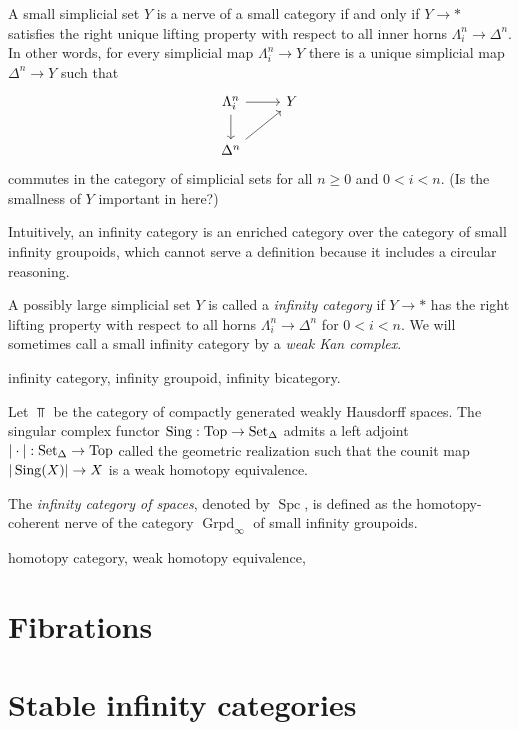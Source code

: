 \documentclass{../../large}
\begin{document}
\begin{prb}
A small simplicial set $Y$ is a nerve of a small category if and only if $Y\to*$ satisfies the right unique lifting property with respect to all inner horns $\Lambda_i^n\to\Delta^n$.
In other words, for every simplicial map $\Lambda_i^n\to Y$ there is a unique simplicial map $\Delta^n\to Y$ such that
\[\begin{tikzcd}
\Lambda_i^n \dar\rar & Y \\
\Delta^n \ar{ur}
\end{tikzcd}\]
commutes in the category of simplicial sets for all $n\ge0$ and $0<i<n$.
(Is the smallness of $Y$ important in here?)
\end{prb}


\begin{prb}
Intuitively, an infinity category is an enriched category over the category of small infinity groupoids, which cannot serve a definition because it includes a circular reasoning.

A possibly large simplicial set $Y$ is called a \emph{infinity category} if $Y\to*$ has the right lifting property with respect to all horns $\Lambda_i^n\to\Delta^n$ for $0<i<n$.
We will sometimes call a small infinity category by a \emph{weak Kan complex}.


infinity category, infinity groupoid, infinity bicategory.
\end{prb}

Let $\Top$ be the category of compactly generated weakly Hausdorff spaces.
The singular complex functor $\operatorname{Sing}:\operatorname{Top}\to\operatorname{Set}_\Delta$ admits a left adjoint $|\cdot|:\operatorname{Set}_\Delta\to\operatorname{Top}$ called the geometric realization such that the counit map $|\operatorname{Sing}(X)|\to X$ is a weak homotopy equivalence.

The \emph{infinity category of spaces}, denoted by $\operatorname{Spc}$, is defined as the homotopy-coherent nerve of the category $\operatorname{Grpd}_\infty$ of small infinity groupoids.

\begin{prb}
homotopy category, weak homotopy equivalence, 
\end{prb}


\section{Fibrations}



\section{Stable infinity categories}
\end{document}
